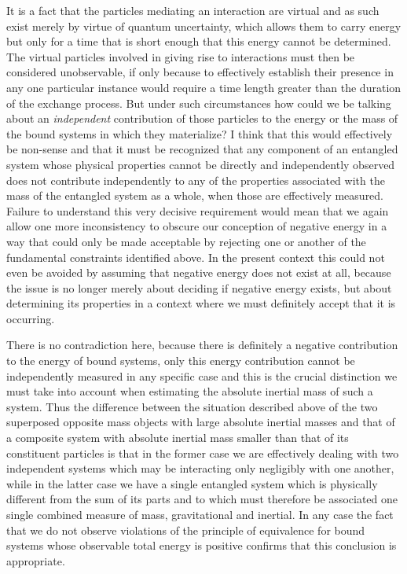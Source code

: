 \documentclass[notitlepage,12pt]{report}
\begin{document}
It is a fact that the particles mediating an interaction are virtual and as such exist merely by virtue of quantum uncertainty, which allows them to carry energy but only for a time that is short enough that this energy cannot be determined. The virtual particles involved in giving rise to interactions must then be considered unobservable, if only because to effectively establish their presence in any one particular instance would require a time length greater than the duration of the exchange process. But under such circumstances how could we be talking about an \textit{independent} contribution of those particles to the energy or the mass of the bound systems in which they materialize? I think that this would effectively be non-sense and that it must be recognized that any component of an entangled system whose physical properties cannot be directly and independently observed does not contribute independently to any of the properties associated with the mass of the entangled system as a whole, when those are effectively measured. Failure to understand this very decisive requirement would mean that we again allow one more inconsistency to obscure our conception of negative energy in a way that could only be made acceptable by rejecting one or another of the fundamental constraints identified above. In the present context this could not even be avoided by assuming that negative energy does not exist at all, because the issue is no longer merely about deciding if negative energy exists, but about determining its properties in a context where we must definitely accept that it is occurring.

There is no contradiction here, because there is definitely a negative contribution to the energy of bound systems, only this energy contribution cannot be independently measured in any specific case and this is the crucial distinction we must take into account when estimating the absolute inertial mass of such a system. Thus the difference between the situation described above of the two superposed opposite mass objects with large absolute inertial masses and that of a composite system with absolute inertial mass smaller than that of its constituent particles is that in the former case we are effectively dealing with two independent systems which may be interacting only negligibly with one another, while in the latter case we have a single entangled system which is physically different from the sum of its parts and to which must therefore be associated one single combined measure of mass, gravitational and inertial. In any case the fact that we do not observe violations of the principle of equivalence for bound systems whose observable total energy is positive confirms that this conclusion is appropriate.
\end{document}

